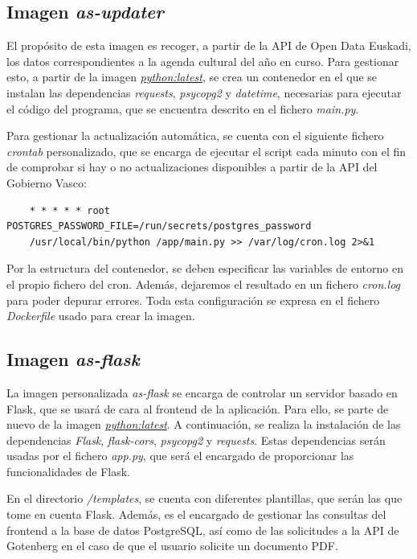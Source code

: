\documentclass{report}
\begin{document}
        \subsection{Imagen \textit{as-updater}}

            El propósito de esta imagen es recoger, a partir de la API de Open Data Euskadi, los datos correspondientes a la agenda cultural del año en curso. Para gestionar esto, a partir de la imagen \textit{\href{https://hub.docker.com/_/python}{python:latest}}, se crea un contenedor en el que se instalan las dependencias \textit{requests}, \textit{psycopg2} y \textit{datetime}, necesarias para ejecutar el código del programa, que se encuentra descrito en el fichero \textit{main.py}.
    
            Para gestionar la actualización automática, se cuenta con el siguiente fichero \textit{crontab} personalizado, que se encarga de ejecutar el script cada minuto con el fin de comprobar si hay o no actualizaciones disponibles a partir de la API del Gobierno Vasco:
    
            \begin{verbatim}
    * * * * * root POSTGRES_PASSWORD_FILE=/run/secrets/postgres_password
    /usr/local/bin/python /app/main.py >> /var/log/cron.log 2>&1
            \end{verbatim}
    
            Por la estructura del contenedor, se deben especificar las variables de entorno en el propio fichero del cron. Además, dejaremos el resultado en un fichero \textit{cron.log} para poder depurar errores. Toda esta configuración se expresa en el fichero \textit{Dockerfile} usado para crear la imagen.

        \subsection{Imagen \textit{as-flask}}

            La imagen personalizada \textit{as-flask} se encarga de controlar un servidor basado en Flask, que se usará de cara al frontend de la aplicación. Para ello, se parte de nuevo de la imagen \textit{\href{https://hub.docker.com/_/python}{python:latest}}. A continuación, se realiza la instalación de las dependencias \textit{Flask}, \textit{flask-cors}, \textit{psycopg2} y \textit{requests}. Estas dependencias serán usadas por el fichero \textit{app.py}, que será el encargado de proporcionar las funcionalidades de Flask.

            En el directorio \textit{/templates}, se cuenta con diferentes plantillas, que serán las que tome en cuenta Flask. Además, es el encargado de gestionar las consultas del frontend a la base de datos PostgreSQL, así como de las solicitudes a la API de Gotenberg en el caso de que el usuario solicite un documento PDF.
\end{document}
